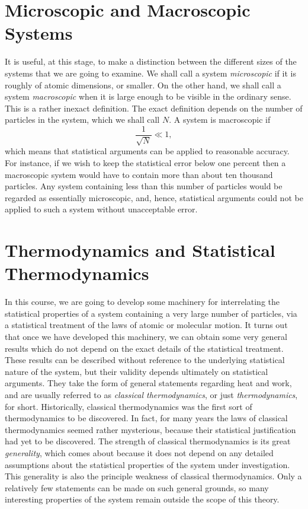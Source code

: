 \section{Microscopic and Macroscopic Systems}
It is useful, at this stage,
 to make a distinction between the different sizes of the systems
that we are going to  examine. We shall call a system {\em microscopic}\/ if it is
roughly of atomic dimensions, or smaller. On the other hand, we shall call
a system {\em macroscopic}\/ when it is large enough to be visible in the
ordinary sense. This is a rather inexact definition. The exact definition
depends on the number of particles in the system, which we shall call $N$.
A system is macroscopic if
$$
\frac{1}{\sqrt{N}} \ll 1,
$$
which means that statistical arguments can be applied to reasonable accuracy.
For instance, if we wish to keep the statistical error below 
one percent then a macroscopic system would have to contain more than about
ten thousand particles. Any system containing less than this number of
particles would be regarded as essentially microscopic, and, hence,
statistical arguments could not be applied to such a system without
unacceptable error. 

\section{Thermodynamics and Statistical Thermodynamics}
In this course, we are going to develop some machinery for interrelating
the statistical properties of a system containing a very large number of
particles, via a
 statistical treatment of the laws  of atomic or molecular motion.
It turns out that once we have developed this machinery, we can obtain some very
general results which do not depend on the exact details of the statistical
treatment. 
These results can be described without
reference to the underlying statistical nature of the system, but their
validity  depends ultimately on statistical arguments. They
take the form of general statements regarding heat and work, and are 
usually referred to as  {\em classical thermodynamics}, or just 
{\em thermodynamics},
for short. Historically, classical thermodynamics was the first sort of 
thermodynamics to be discovered. In fact, for many years  
the laws of classical
thermodynamics seemed rather mysterious, because their statistical
justification had yet to be discovered.
 The strength of classical
thermodynamics is its great {\em generality}, 
which comes about because it does not
depend on any detailed assumptions about the statistical properties
of the system under investigation. This   generality 
is also the principle weakness of classical thermodynamics. Only a relatively
few statements can be made on such general grounds, so many interesting
properties of the system remain outside the scope of this theory.


